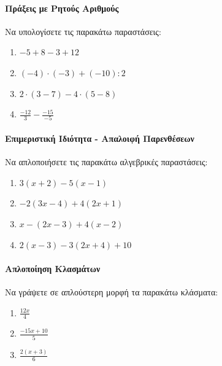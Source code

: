 \documentclass[11pt,a4paper,modern]{FFExercises}
\begin{document}

\paragraph{Πράξεις με Ρητούς Αριθμούς}
\askhsh Να υπολογίσετε τις παρακάτω παραστάσεις:
\begin{enumerate}[label=\roman*)]
    \item $-5 + 8 - 3 + 12$
    \item $(-4) \cdot (-3) + (-10) : 2$
    \item $2 \cdot (3 - 7) - 4 \cdot (5 - 8)$
    \item $\frac{-12}{3} - \frac{-15}{-5}$
\end{enumerate}

\paragraph{Επιμεριστική Ιδιότητα - Απαλοιφή Παρενθέσεων}
\askhsh Να απλοποιήσετε τις παρακάτω αλγεβρικές παραστάσεις:
\begin{enumerate}[label=\roman*)]
    \item $3(x + 2) - 5(x - 1)$
    \item $-2(3x - 4) + 4(2x + 1)$
    \item $x - (2x - 3) + 4(x - 2)$
    \item $2(x - 3) - 3(2x + 4) + 10$
\end{enumerate}

\paragraph{Απλοποίηση Κλασμάτων}
\askhsh Να γράψετε σε απλούστερη μορφή τα παρακάτω κλάσματα:
\begin{enumerate}[label=\roman*)]
    \item $\frac{12x}{4}$
    \item $\frac{-15x + 10}{5}$
    \item $\frac{2(x + 3)}{6}$
\end{enumerate}
\end{document}
